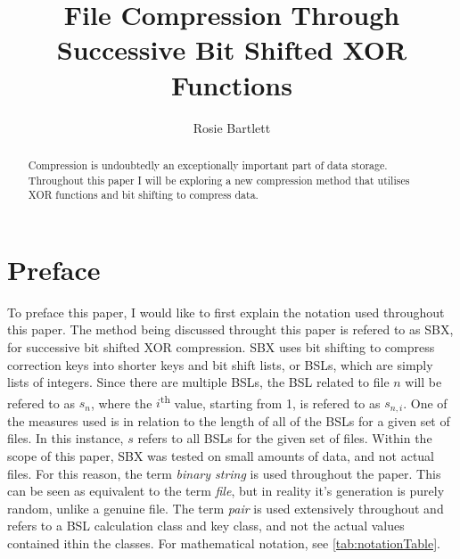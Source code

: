 \documentclass{hehe}
\title{File Compression Through Successive Bit Shifted XOR Functions}
\author{Rosie Bartlett}
\begin{document}
\maketitle

\begin{abstract}
Compression is undoubtedly an exceptionally important part of data storage. Throughout this paper I will be exploring a new compression method that utilises XOR functions and bit shifting to compress data.
\end{abstract}

\section{Preface}

To preface this paper, I would like to first explain the notation used throughout this paper. The method being discussed throught this paper is refered to as SBX, for successive bit shifted XOR compression. SBX uses bit shifting to compress correction keys into shorter keys and bit shift lists, or BSLs, which are simply lists of integers. Since there are multiple BSLs, the BSL related to file $n$ will be refered to as $s_n$, where the $i$\textsuperscript{th} value, starting from 1, is refered to as $s_{n,i}$. One of the measures used is in relation to the length of all of the BSLs for a given set of files. In this instance, $s$ refers to all BSLs for the given set of files. Within the scope of this paper, SBX was tested on small amounts of data, and not actual files. For this reason, the term \textit{binary string} is used throughout the paper. This can be seen as equivalent to the term \textit{file}, but in reality it's generation is purely random, unlike a genuine file. The term \textit{pair} is used extensively throughout and refers to a BSL calculation class and key class, and not the actual values contained ithin the classes. For mathematical notation, see \cref{tab:notationTable}.
\end{document}
